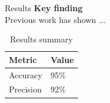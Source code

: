 \begin{block}{Results}
  \textbf{Key finding} \\
  Previous work has shown ...

  \begin{table}
    \centering
    \small
    \begin{tabularx}{\textwidth}{XX}
      \toprule
      Metric & Value \\
      \midrule
      Accuracy & 95\% \\
      Precision & 92\% \\
      \bottomrule
    \end{tabularx}
    \caption{Results summary}
  \end{table}
\end{block}